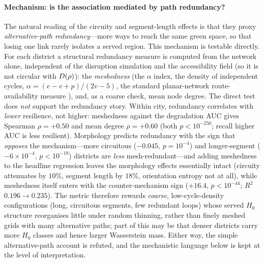 \paragraph{Mechanism: is the association mediated by path redundancy?} The natural
reading of the circuity and segment-length effects is that they proxy
\emph{alternative-path redundancy}---more ways to reach the same green space, so that
losing one link rarely isolates a served region. This mechanism is testable directly.
For each district a structural redundancy measure is computed from the network alone,
independent of the disruption simulation and the accessibility field (so it is not
circular with $D(\rho)$): the \emph{meshedness} (the $\alpha$ index, the density of
independent cycles, $\alpha=(e-v+p)/(2v-5)$, the standard planar-network route-
availability measure \citep{barthelemy2011spatial}), and, as a coarse check, mean
node degree. The direct test does \emph{not} support the redundancy story. Within
city, redundancy correlates with \emph{lower} resilience, not higher: meshedness
against the degradation AUC gives Spearman $\rho=+0.50$ and mean degree $\rho=+0.60$
(both $p<10^{-250}$; recall higher AUC is less resilient). Morphology predicts
redundancy with the sign that \emph{opposes} the mechanism---more circuitous
($-0.045$, $p=10^{-4}$) and longer-segment ($-6\times10^{-4}$, $p<10^{-19}$) districts
are \emph{less} mesh-redundant---and adding meshedness to the headline regression
leaves the morphology effects essentially intact (circuity attenuates by $10\%$,
segment length by $18\%$, orientation entropy not at all), while meshedness itself
enters with the counter-mechanism sign ($+16.4$, $p<10^{-44}$; $R^2$ $0.196\to0.235$).
The metric therefore rewards \emph{coarse}, low-cycle-density configurations (long,
circuitous segments, few redundant loops) whose served $H_0$ structure reorganises
little under random thinning, rather than finely meshed grids with many alternative
paths; part of this may be that denser districts carry more $H_0$ classes and hence
larger Wasserstein mass. Either way, the simple alternative-path account is refuted,
and the mechanistic language below is kept at the level of interpretation.

